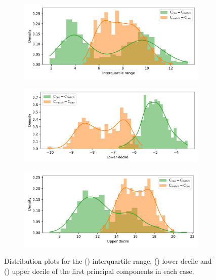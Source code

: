 \documentclass[smallextended]{svjour3}
\newcommand{\imgwidth}{.85\textwidth}
\begin{document}
\begin{figure}
    \centering
    \begin{subfigure}{\imgwidth}
        \includegraphics[width=\linewidth]{Fig11a.pdf}
        \caption{}\label{fig:edo_iqr}
    \end{subfigure}\vfill%

    \begin{subfigure}{\imgwidth}
        \includegraphics[width=\linewidth]{Fig11b.pdf}
        \caption{}\label{fig:edo_lower}
    \end{subfigure}\vfill%
    
    \begin{subfigure}{\imgwidth}
        \includegraphics[width=\linewidth]{Fig11c.pdf}
        \caption{}\label{fig:edo_upper}
    \end{subfigure}
    \caption{Distribution plots for the () interquartile
        range, () lower decile and
        () upper decile of the first principal components
        in each case.}\label{fig:edo_quantiles}
\end{figure}
\end{document}
